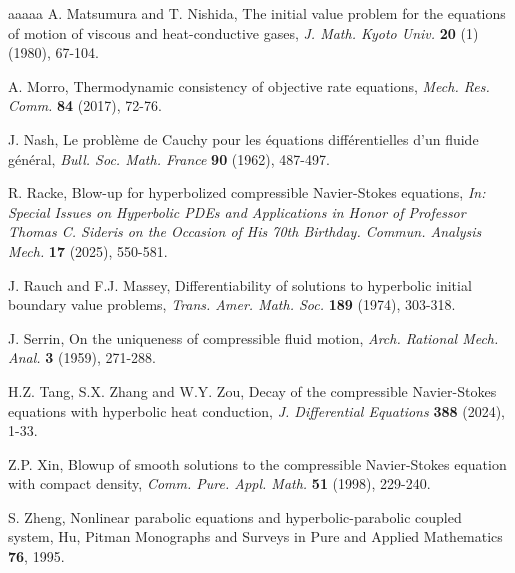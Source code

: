 \documentclass[11pt,reqno]{amsart}
\numberwithin{equation}{section}
\begin{document}
\begin{thebibliography}{aaaaa}
   A. Matsumura and T. Nishida, The initial value problem for the
equations of motion of viscous and heat-conductive gases, \textit{J. Math.
Kyoto Univ.} \textbf{20} (1) (1980), 67-104.

  A. Morro, Thermodynamic consistency of objective rate equations, \textit{Mech. Res. Comm.} \textbf{84} (2017), 72-76.


 J. Nash, Le probl\`{e}me de Cauchy pour les \'{e}quations
diff\'{e}rentielles d'un fluide g\'{e}n\'{e}ral, \textit{Bull. Soc. Math.
France} \textbf{90} (1962), 487-497.


 R. Racke, Blow-up for hyperbolized compressible Navier-Stokes equations, \textit{In: Special Issues on Hyperbolic PDEs and Applications in Honor of Professor Thomas C. Sideris on the Occasion of His 70th Birthday. Commun. Analysis  Mech.} \textbf{17} (2025), 550-581.


  J. Rauch and F.J. Massey, Differentiability of solutions to hyperbolic initial boundary value problems, {\it Trans. Amer. Math. Soc.} {\bf 189} (1974), 303-318.



 J. Serrin, On the uniqueness of compressible fluid motion, \textit{Arch. Rational Mech. Anal.} \textbf{3} (1959), 271-288.


 H.Z. Tang, S.X. Zhang and W.Y. Zou, Decay of the compressible Navier-Stokes equations with hyperbolic heat conduction, \textit{J. Differential Equations} \textbf{388} (2024), 1-33.


 Z.P. Xin, Blowup of smooth solutions to the compressible Navier-Stokes equation
with compact density, \textit{Comm. Pure. Appl. Math.} \textbf{51} (1998), 229-240.


  S. Zheng, Nonlinear parabolic equations and hyperbolic-parabolic coupled system, Hu,   Pitman Monographs and Surveys in Pure and Applied Mathematics {\bf 76}, 1995.

\end{thebibliography}
\end{document}
